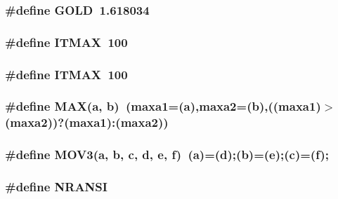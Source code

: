 \subsubsection{\setlength{\rightskip}{0pt plus 5cm}\#define GOLD~1.618034}\label{nrmin_8c_f468028083c9e52aa2c94ef3b9940450}


\subsubsection{\setlength{\rightskip}{0pt plus 5cm}\#define ITMAX~100}\label{nrmin_8c_3641b6d4c21b7a852dbb32c2b693302e}


\subsubsection{\setlength{\rightskip}{0pt plus 5cm}\#define ITMAX~100}\label{nrmin_8c_3641b6d4c21b7a852dbb32c2b693302e}


\subsubsection{\setlength{\rightskip}{0pt plus 5cm}\#define MAX(a, b)~({\bf maxa1}=(a),{\bf maxa2}=(b),(({\bf maxa1})$>$({\bf maxa2}))?({\bf maxa1}):({\bf maxa2}))}\label{nrmin_8c_fa99ec4acc4ecb2dc3c2d05da15d0e3f}


\subsubsection{\setlength{\rightskip}{0pt plus 5cm}\#define MOV3(a, b, c, d, e, f)~(a)=(d);(b)=(e);(c)=(f);}\label{nrmin_8c_fa069e7bc1c4fc253e85c69fce265d2b}


\subsubsection{\setlength{\rightskip}{0pt plus 5cm}\#define NRANSI}\label{nrmin_8c_c35ec264c922c9b83f2b3d79cb8f5d93}



